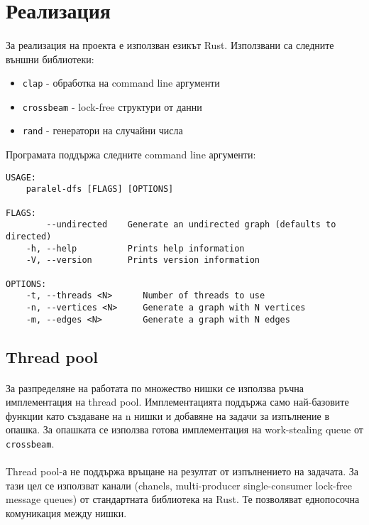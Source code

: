 \section{Реализация}

\paragraph*{} За реализация на проекта е използван езикът Rust. Използвани са следните външни библиотеки:
\begin{itemize}
\item \verb|clap| - обработка на command line аргументи
\item \verb|crossbeam| - lock-free структури от данни
\item \verb|rand| - генератори на случайни числа
\end{itemize}

Програмата поддържа следните command line аргументи:
\begin{verbatim}
USAGE:
    paralel-dfs [FLAGS] [OPTIONS]

FLAGS:
        --undirected    Generate an undirected graph (defaults to directed)
    -h, --help          Prints help information
    -V, --version       Prints version information

OPTIONS:
    -t, --threads <N>      Number of threads to use
    -n, --vertices <N>     Generate a graph with N vertices
    -m, --edges <N>        Generate a graph with N edges
\end{verbatim}

\subsection*{Thread pool}

\paragraph*{} За разпределяне на работата по множество нишки се използва ръчна имплементация на thread pool. Имплементацията поддържа само най-базовите функции като създаване на n нишки и добавяне на задачи за изпълнение в опашка. За опашката се използва готова имплементация на work-stealing queue от \verb|crossbeam|.

\paragraph*{} Thread pool-а не поддържа връщане на резултат от изпълнението на задачата. За тази цел се използват канали (chanels, multi-producer single-consumer lock-free message queues) от стандартната библиотека на Rust. Те позволяват еднопосочна комуникация между нишки.

